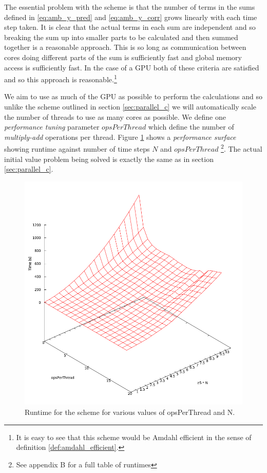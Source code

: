 The essential problem with the scheme is that the number of terms in the sums defined in \eqref{eq:amb_y_pred} and \eqref{eq:amb_y_corr} grows linearly with each time step taken. It is clear that the actual terms in each sum are independent and so breaking the sum up into smaller parts to be calculated and then summed together is a reasonable approach. This is so long as communication between cores doing different parts of the sum is sufficiently fast and global memory access is sufficiently fast. In the case of a GPU both of these criteria are satisfied and so this approach is reasonable.\footnote{It is easy to see that this scheme would be Amdahl efficient in the sense of definition \ref{def:amdahl_efficient}.}

We aim to use as much of the GPU as possible to perform the calculations and so unlike the scheme outlined in section \ref{sec:parallel_c} we will automatically scale the number of threads to use as many cores as possible. We define one \emph{performance tuning} parameter $ opsPerThread $ which define the number of \emph{multiply-add} operations per thread. 
Figure \ref{fig:cuda_performance_surface} shows a \emph{performance surface} showing runtime against number of time steps $ N $ and $ opsPerThread $ \footnote{See appendix B for a full table of runtimes}. The actual initial value problem being solved is exactly the same as in section \ref{sec:parallel_c}.

\begin{figure}[H]
\includegraphics[scale = 0.4]{images/CUDA_Performance_No_Label}
\caption{Runtime for the scheme for various values of opsPerThread and N.}
\label{fig:cuda_performance_surface}
\end{figure}

